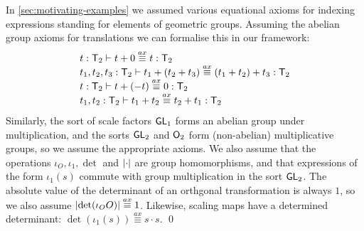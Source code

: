 \begin{example*}
  \label{ex:two-dim-geo-axioms}
  In \autoref{sec:motivating-examples} we assumed 
  various equational axioms %
  for indexing expressions standing for
  elements of geometric groups. Assuming the abelian group axioms for
  translations we can formalise this in our %
  framework:
  \begin{displaymath}
    \begin{array}{l}
      t : \mathsf{T}_2 \vdash t + 0 \stackrel{ax}\equiv t : \mathsf{T}_2 \\
      t_1, t_2, t_3 : \mathsf{T}_2 \vdash t_1 + (t_2 + t_3) \stackrel{ax}\equiv (t_1 + t_2) + t_3 : \mathsf{T}_2 \\
      t : \mathsf{T}_2 \vdash t + (-t) \stackrel{ax}\equiv 0 : \mathsf{T}_2 \\
      t_1, t_2 : \mathsf{T}_2 \vdash t_1 + t_2 \stackrel{ax}\equiv t_2 + t_1 : \mathsf{T}_2 \\
    \end{array}
  \end{displaymath}
  Similarly, the sort of scale factors $\mathsf{GL}_1$ forms an abelian
  group under multiplication, and the sorts $\mathsf{GL}_2$ and
  $\mathsf{O}_2$ form (non-abelian) multiplicative groups, so we assume
  the appropriate axioms. We also assume that the operations $\iota_O,
  \iota_1, \det$ and $\lvert \cdot \rvert$ are group homomorphisms, and that
  expressions of the form $\iota_1(s)$ commute with group
  multiplication in the sort $\mathsf{GL}_2$. The absolute value of the
  determinant of an orthgonal transformation is always $1$, so we also
  assume $\lvert \det(\iota_OO) \rvert \stackrel{ax}\equiv 1$. Likewise, scaling
  maps have a determined determinant: $\det(\iota_1(s))
  \stackrel{ax}\equiv s \cdot s$.
\qed
\end{example*}

